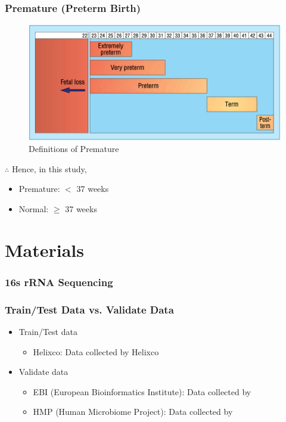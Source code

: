 \documentclass{beamer}
\begin{document}
    \begin{frame}
        \frametitle{Premature (Preterm Birth)}

        \begin{figure}[h!]
            \includegraphics[width=0.6 \linewidth]{figures/premature.png}
            \caption{Definitions of Premature \protect \cite{premature1}}
        \end{figure}

        $\therefore$ Hence, in this study,
        \begin{itemize}
            \item Premature: $<$ 37 weeks
            \item Normal: $\ge$ 37 weeks
        \end{itemize}
    \end{frame}

    \section{Materials}
    \begin{frame}
        \frametitle{16s rRNA Sequencing}
    \end{frame}

    \begin{frame}
        \frametitle{Train/Test Data vs. Validate Data}

        \begin{itemize}
            \item Train/Test data
            \begin{itemize}
                \item Helixco: Data collected by Helixco
            \end{itemize}

            \item Validate data
            \begin{itemize}
                \item EBI (European Bioinformatics Institute): Data collected by 
                \item HMP (Human Microbiome Project): Data collected by 
            \end{itemize}
        \end{itemize}

        \begin{table}
            \centering
            
        \end{table}
    \end{frame}
\end{document}
